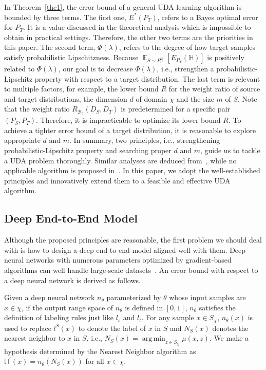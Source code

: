 \documentclass[journal,twocolumn]{IEEEtran}
\theoremstyle{definition}
\DeclareMathOperator*{\argmin}{arg\,min}
\begin{document}
In Theorem~\ref{the1}, the error bound of a general UDA learning algorithm is bounded by three terms. The first one, $E^*(P_T)$, refers to a Bayes optimal error for $P_T$. It is a value discussed in the theoretical analysis which is impossible to obtain in practical settings. Therefore, the other two terms are the priorities in this paper. The second term, $\Phi(\lambda)$, refers to the degree of how target samples satisfy  probabilistic Lipschitzness. Because $\mathop{\mathbb{E}}_{S\sim P_S^m}[E_{P_T}(\mathbb{H})]$ is positively related to $\Phi(\lambda)$, our goal is to decrease $\Phi(\lambda)$, i.e., strengthen a probabilistic-Lipschitz property with respect to a target distribution. The last term is relevant to multiple factors, for example, the lower bound $R$ for the weight ratio of source and target distributions, the dimension $d$ of domain $\chi$ and the size $m$ of $S$. Note that the weight ratio $R_{\mathcal{B}_{\gamma}}(D_S,D_T)$ is predetermined for a specific pair $(P_S,P_T)$. Therefore, it is impracticable to optimize its lower bound $R$. To achieve a tighter error bound of a target distribution, it is reasonable to explore appropriate $d$ and $m$. In summary, two principles, i.e., strengthening probabilistic-Lipschitz property and searching proper $d$ and $m$, guide us to tackle a UDA problem thoroughly. Similar analyses are deduced from~\cite{Ben-David2014}, while no applicable algorithm is proposed in~\cite{Ben-David2014}. In this paper, we adopt the well-established principles and innovatively extend them to a feasible and effective UDA algorithm.

\subsection{Deep End-to-End Model}
\label{deep}

Although the proposed principles are reasonable, the first problem we should deal with is how to design a deep end-to-end model aligned well with them. Deep neural networks with numerous parameters optimized by gradient-based algorithms can well handle large-scale datasets~\cite{krizhevsky2012imagenet}. An error bound with respect to a deep neural network is  derived as follows.

Given a deep neural network $n_\theta$ parameterized by $\theta$ whose input samples are $x\in\chi$, if the output range space of $n_\theta$ is defined in $[0, 1]$, $n_\theta$ satisfies the definition of labeling rules just like $l_s$ and $l_t$. For any sample $x\in S_{\chi}$, $n_\theta(x)$ is used to replace $l^S(x)$ to denote the label of $x$ in $S$ and $N_S(x)$ denotes the nearest neighbor to $x$ in $S$, i.e., $N_S(x)=\argmin_{z\in S_\chi}\mu(x,z)$. We make a hypothesis determined by the Nearest Neighbor algorithm as $\mathbb{H^\prime}(x)=n_\theta(N_S(x))$ for all $x\in\chi$.
\end{document}
